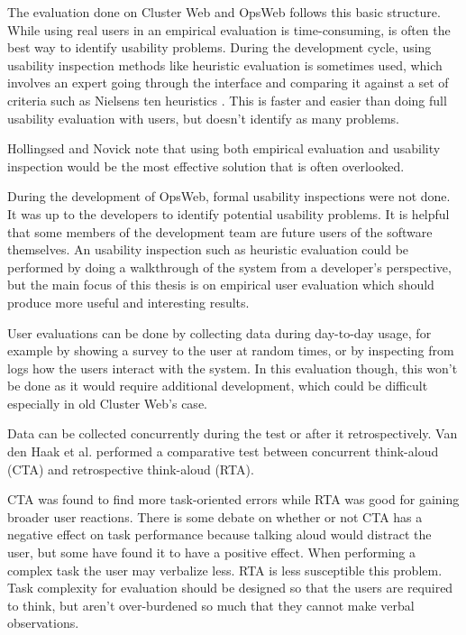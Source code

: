 \cite{rubin2008handbook}

The evaluation done on Cluster Web and OpsWeb follows this basic structure. While using real users in an empirical evaluation is time-consuming, is often the best way to identify usability problems. During the development cycle, using usability inspection methods like heuristic evaluation is sometimes used, which involves an expert going through the interface and comparing it against a set of criteria such as Nielsens ten heuristics \cite{Solr-oula.410573, nielsen1995usability}. This is faster and easier than doing full usability evaluation with users, but doesn't identify as many problems.

Hollingsed and Novick note that using both empirical evaluation and usability inspection would be the most effective solution that is often overlooked. \cite{hollingsed2007usability}

During the development of OpsWeb, formal usability inspections were not done. It was up to the developers to identify potential usability problems. It is helpful that some members of the development team are future users of the software themselves. An usability inspection such as heuristic evaluation could be performed by doing a walkthrough of the system from a developer's perspective, but the main focus of this thesis is on empirical user evaluation which should produce more useful and interesting results.

User evaluations can be done by collecting data during day-to-day usage, for example by showing a survey to the user at random times, or by inspecting from logs how the users interact with the system. \cite{bevanevaluation} In this evaluation though, this won't be done as it would require additional development, which could be difficult especially in old Cluster Web's case.

Data can be collected concurrently during the test or after it retrospectively. Van den Haak et al. performed a comparative test between concurrent think-aloud (CTA) and retrospective think-aloud (RTA).

CTA was found to find more task-oriented errors while RTA was good for gaining broader user reactions. There is some debate on whether or not CTA has a negative effect on task performance because talking aloud would distract the user, but some have found it to have a positive effect. When performing a complex task the user may verbalize less. RTA is less susceptible this problem. Task complexity for evaluation should be designed so that the users are required to think, but aren't over-burdened so much that they cannot make verbal observations.
\cite{van2003retrospective}

